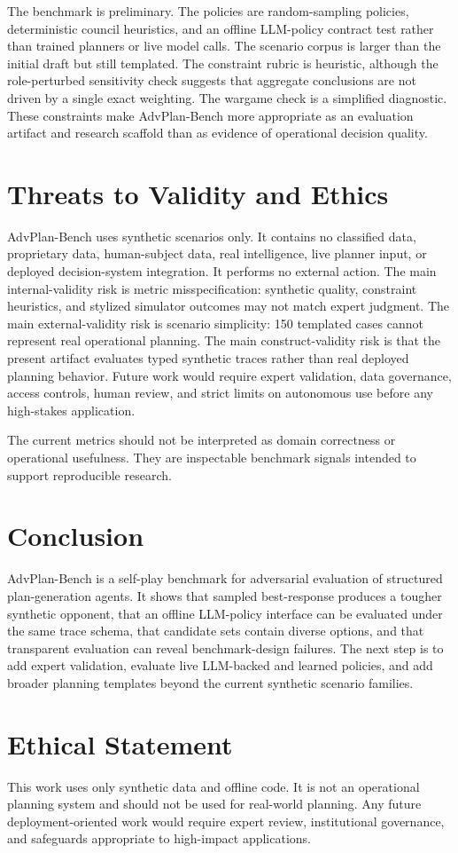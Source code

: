 \documentclass[letterpaper]{article} %
\begin{document}
The benchmark is preliminary. The policies are random-sampling policies, deterministic council heuristics, and an offline LLM-policy contract test rather than trained planners or live model calls. The scenario corpus is larger than the initial draft but still templated. The constraint rubric is heuristic, although the role-perturbed sensitivity check suggests that aggregate conclusions are not driven by a single exact weighting. The wargame check is a simplified diagnostic. These constraints make AdvPlan-Bench more appropriate as an evaluation artifact and research scaffold than as evidence of operational decision quality.

\section{Threats to Validity and Ethics}

AdvPlan-Bench uses synthetic scenarios only. It contains no classified data, proprietary data, human-subject data, real intelligence, live planner input, or deployed decision-system integration. It performs no external action. The main internal-validity risk is metric misspecification: synthetic quality, constraint heuristics, and stylized simulator outcomes may not match expert judgment. The main external-validity risk is scenario simplicity: 150 templated cases cannot represent real operational planning. The main construct-validity risk is that the present artifact evaluates typed synthetic traces rather than real deployed planning behavior. Future work would require expert validation, data governance, access controls, human review, and strict limits on autonomous use before any high-stakes application.

The current metrics should not be interpreted as domain correctness or operational usefulness. They are inspectable benchmark signals intended to support reproducible research.

\section{Conclusion}

AdvPlan-Bench is a self-play benchmark for adversarial evaluation of structured plan-generation agents. It shows that sampled best-response produces a tougher synthetic opponent, that an offline LLM-policy interface can be evaluated under the same trace schema, that candidate sets contain diverse options, and that transparent evaluation can reveal benchmark-design failures. The next step is to add expert validation, evaluate live LLM-backed and learned policies, and add broader planning templates beyond the current synthetic scenario families.

\section*{Ethical Statement}

This work uses only synthetic data and offline code. It is not an operational planning system and should not be used for real-world planning. Any future deployment-oriented work would require expert review, institutional governance, and safeguards appropriate to high-impact applications.


\end{document}
